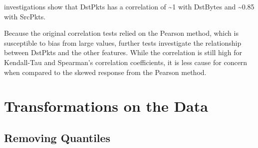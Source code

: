 \documentclass[12pt,twoside]{dukestatscithesis}
\theoremstyle{definition}
\theoremstyle{definition}
\theoremstyle{definition}
\theoremstyle{remark}
\begin{document}
investigations show that DstPkts has a correlation of \textasciitilde{}1
with DstBytes and \textasciitilde{}0.85 with SrcPkts.
\begin{Shaded}
\begin{Highlighting}[]
 \NormalTok{)}
 \NormalTok{)}
 \NormalTok{)}
 \NormalTok{)}
\end{Highlighting}
\end{Shaded}
Because the original correlation tests relied on the Pearson method,
which is susceptible to bias from large values, further tests
investigate the relationship between DstPkts and the other features.
While the correlation is still high for Kendall-Tau and Spearman's
correlation coefficients, it is less cause for concern when compared to
the skewed response from the Pearson method.

\section{Transformations on the Data}\label{transformations-on-the-data}

\subsection{Removing Quantiles}\label{removing-quantiles}
\end{document}
